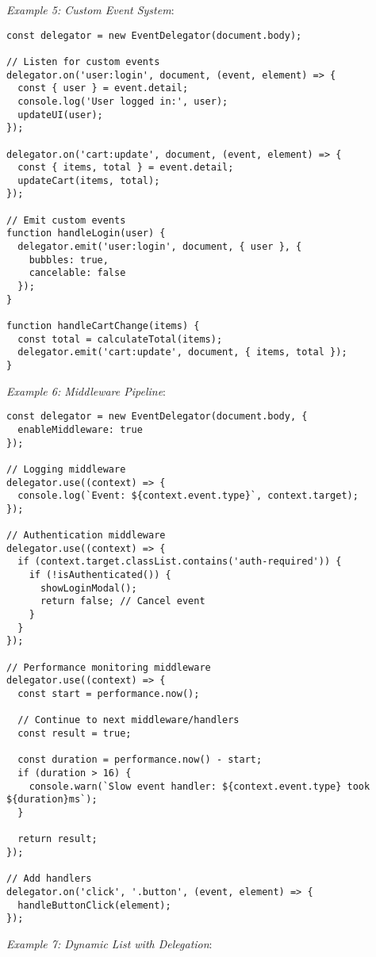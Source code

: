 \documentclass[11pt]{article}
\begin{document}
\emph{Example 5: Custom Event System}:

\begin{verbatim}
const delegator = new EventDelegator(document.body);

// Listen for custom events
delegator.on('user:login', document, (event, element) => {
  const { user } = event.detail;
  console.log('User logged in:', user);
  updateUI(user);
});

delegator.on('cart:update', document, (event, element) => {
  const { items, total } = event.detail;
  updateCart(items, total);
});

// Emit custom events
function handleLogin(user) {
  delegator.emit('user:login', document, { user }, {
    bubbles: true,
    cancelable: false
  });
}

function handleCartChange(items) {
  const total = calculateTotal(items);
  delegator.emit('cart:update', document, { items, total });
}
\end{verbatim}

\emph{Example 6: Middleware Pipeline}:

\begin{verbatim}
const delegator = new EventDelegator(document.body, {
  enableMiddleware: true
});

// Logging middleware
delegator.use((context) => {
  console.log(`Event: ${context.event.type}`, context.target);
});

// Authentication middleware
delegator.use((context) => {
  if (context.target.classList.contains('auth-required')) {
    if (!isAuthenticated()) {
      showLoginModal();
      return false; // Cancel event
    }
  }
});

// Performance monitoring middleware
delegator.use((context) => {
  const start = performance.now();
  
  // Continue to next middleware/handlers
  const result = true;
  
  const duration = performance.now() - start;
  if (duration > 16) {
    console.warn(`Slow event handler: ${context.event.type} took ${duration}ms`);
  }
  
  return result;
});

// Add handlers
delegator.on('click', '.button', (event, element) => {
  handleButtonClick(element);
});
\end{verbatim}

\emph{Example 7: Dynamic List with Delegation}:
\end{document}
